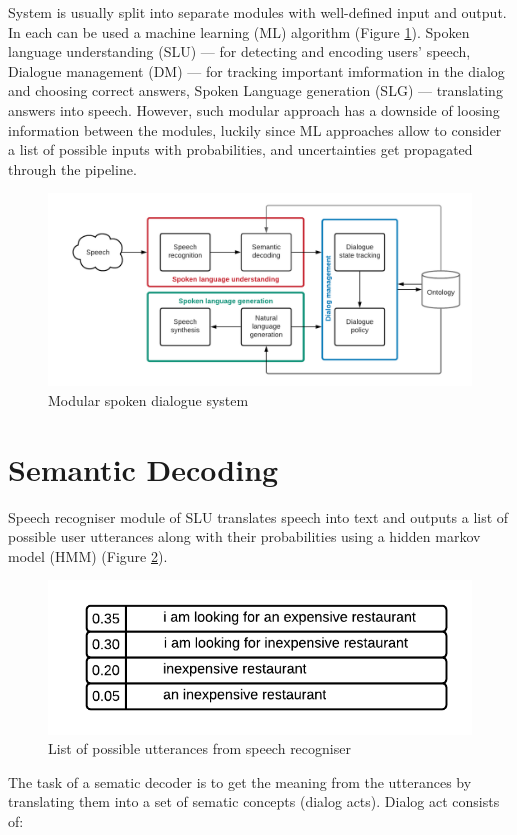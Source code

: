 \documentclass[12pt,titlepage,a4paper]{article}
\begin{document}
System is usually split into separate modules \cite{Structure} with well-defined input and output. In each can be used a machine learning (ML) algo\-rithm (Figure \ref{fig:SDS-main}). Spoken language understanding (SLU) --- for detecting and encoding users' speech, Dialogue manage\-ment (DM) --- for tracking important imformation in the dialog and choosing correct answers, Spoken Language gene\-ration (SLG) --- translating answers into speech. However, such modular approach has a downside of loosing information bet\-ween the modules, luckily since ML approaches allow to consider a list of possible inputs with probabilities, and uncertainties get propagated through the pipeline.

\begin{figure}[!h]
    \centering
    \includegraphics[width=\linewidth]{SDS-main.png}
    \caption{Modular spoken dialogue system}
    \label{fig:SDS-main}
\end{figure}


\pagebreak
\section{Semantic Decoding}
Speech recogniser module of SLU translates speech into text and outputs a list of possible user utterances along with their probabilities using a hidden markov model (HMM)\cite{HMM} (Figure \ref{fig:several}).

\begin{figure}[!h]
    \centering
    \includegraphics[width=0.65\linewidth]{uncertanty.png}
    \caption{List of possible utterances from speech recogniser}
    \label{fig:several}
\end{figure}
The task of a sematic decoder is to get the meaning from the utterances by translating them into a set of sematic concepts (dia\-log acts). Dialog act consists of: 
\end{document}

